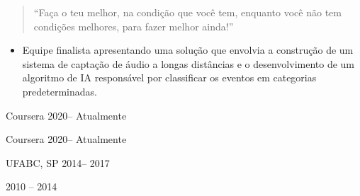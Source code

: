 
\begin{quote}
``Faça o teu melhor, na condição que você tem, enquanto você não tem condições melhores, 
  para fazer melhor ainda!''
\end{quote}

\begin{itemize}

\justifying
\item Equipe finalista apresentando uma solução que envolvia a construção
      de um sistema de captação de áudio a longas distâncias e o desenvolvimento de um 
      algoritmo de IA responsável por classificar os eventos em categorias 
      predeterminadas.
  
\end{itemize}



 {Coursera} {2020-- Atualmente}{} 

 {Coursera} {2020-- Atualmente}{} 

 {UFABC, SP} {2014-- 2017}{} 

 {2010 -- 2014}{}


\clearpage
